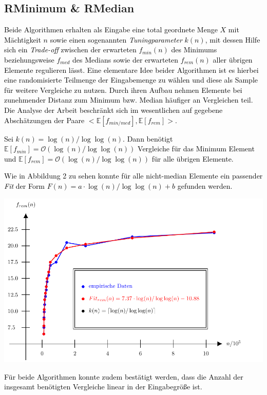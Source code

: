 \documentclass[a1,portrait]{a0poster}
\begin{document}
\begin{multicols}{2}
\section{RMinimum \& RMedian}
\vspace*{-0.05cm}
\noindent
\textcolor{black}{
Beide Algorithmen erhalten als Eingabe eine total geordnete Menge $X$ 
mit Mächtigkeit $n$ sowie einen sogenannten \textit{Tuningparameter} $k(n)$, 
mit dessen Hilfe sich ein \textit{Trade-off} zwischen der erwarteten 
\fg $f_{min}(n)$ des Minimums beziehungsweise $f_{med}$ des Medians sowie der 
erwarteten \fg $f_{rem}(n)$ aller übrigen Elemente regulieren lässt. 
Eine elementare Idee beider Algorithmen ist es hierbei eine randomisierte Teilmenge 
der Eingabemenge zu wählen und diese als Sample für weitere Vergleiche zu nutzen.
Durch ihren Aufbau nehmen Elemente bei zunehmender Distanz zum 
Minimum bzw. Median häufiger an Vergleichen teil. Die Analyse der Arbeit beschränkt sich im wesentlichen auf gegebene 
Abschätzungen der Paare $<\mathbb{E}[f_{min/med}],\mathbb{E}[f_{rem}]>$.}
\begin{manualtheorem}{1}
    \textcolor{black}{
    Sei $k(n)=\log(n)/\log\log(n)$. Dann benötigt \Rm $\mathbb{E}[f_{min}]=\mathcal{O}(\log(n)/\log\log(n))$ Vergleiche für das Minimum Element und $\mathbb{E}[f_{rem}]=\mathcal{O}(\log(n)/\log\log(n))$ für alle übrigen Elemente.}
\end{manualtheorem}

\noindent
\textcolor{black}{
Wie in Abbildung 2 zu sehen konnte für alle nicht-median Elemente ein passender \textit{Fit} der Form $F(n) = a \cdot \log(n)/ \log\log(n) + b$ gefunden werden.}

\begin{center}
    \includegraphics[scale=1.5]{pics/theo5_rem}
    \vspace*{-2cm}
\end{center}
\noindent
\textcolor{black}{
Für beide Algorithmen konnte zudem bestätigt werden, dass die Anzahl 
der insgesamt benötigten Vergleiche linear in der Eingabegröße ist.}



\end{multicols}
\end{document}
